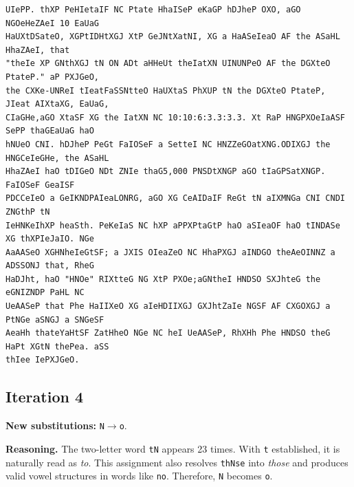 \documentclass[11pt,a4paper]{article}
\begin{document}
\begin{lstlisting}[style=ciphertext,caption={Complete text after iteration 3}]
UIePP. thXP PeHIetaIF NC Ptate HhaISeP eKaGP hDJheP OXO, aGO NGOeHeZAeI 10 EaUaG
HaUXtDSateO, XGPtIDHtXGJ XtP GeJNtXatNI, XG a HaASeIeaO AF the ASaHL HhaZAeI, that
"theIe XP GNthXGJ tN ON ADt aHHeUt theIatXN UINUNPeO AF the DGXteO PtateP." aP PXJGeO,
the CXKe-UNReI tIeatFaSSNtteO HaUXtaS PhXUP tN the DGXteO PtateP, JIeat AIXtaXG, EaUaG,
CIaGHe,aGO XtaSF XG the IatXN NC 10:10:6:3.3:3.3. Xt RaP HNGPXOeIaASF SePP thaGEaUaG haO
hNUeO CNI. hDJheP PeGt FaIOSeF a SetteI NC HNZZeGOatXNG.ODIXGJ the HNGCeIeGHe, the ASaHL
HhaZAeI haO tDIGeO NDt ZNIe thaG5,000 PNSDtXNGP aGO tIaGPSatXNGP. FaIOSeF GeaISF
PDCCeIeO a GeIKNDPAIeaLONRG, aGO XG CeAIDaIF ReGt tN aIXMNGa CNI CNDI ZNGthP tN
IeHNKeIhXP heaSth. PeKeIaS NC hXP aPPXPtaGtP haO aSIeaOF haO tINDASe XG thXPIeJaIO. NGe
AaAASeO XGHNheIeGtSF; a JXIS OIeaZeO NC HhaPXGJ aINDGO theAeOINNZ a ADSSONJ that, RheG
HaDJht, haO "HNOe" RIXtteG NG XtP PXOe;aGNtheI HNDSO SXJhteG the eGNIZNDP PaHL NC
UeAASeP that Phe HaIIXeO XG aIeHDIIXGJ GXJhtZaIe NGSF AF CXGOXGJ a PtNGe aSNGJ a SNGeSF
AeaHh thateYaHtSF ZatHheO NGe NC heI UeAASeP, RhXHh Phe HNDSO theG HaPt XGtN thePea. aSS
thIee IePXJGeO.
\end{lstlisting}

\newpage
\subsection{Iteration 4}

\noindent\textbf{New substitutions:} \texttt{N}$\rightarrow$\texttt{o}.\par
\smallskip
\noindent\textbf{Reasoning.} The two-letter word \texttt{tN} appears 23 times. With \texttt{t} established, it is naturally read as \textit{to}. This assignment also resolves \texttt{thNse} into \textit{those} and produces valid vowel structures in words like \texttt{no}. Therefore, \texttt{N} becomes \texttt{o}.
\end{document}
